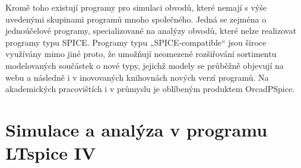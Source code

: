     Kromě toho existují programy pro simulaci obvodů, které nemají s výše uvedenými skupinami programů mnoho společného. Jedná se zejména o
    jednoúčelové programy, specializované na analýzy obvodů, které nelze realizovat programy typu SPICE. Programy typu „SPICE-compatible“ jsou široce
    využívány mimo jiné proto, že umožňují neomezené rozšiřování sortimentu modelovaných součástek o nové typy, jejichž modely se průběžně objevují na
    webu a následně i v inovovaných knihovnách nových verzí programů. Na akademických pracovištích i v průmyslu je oblíbeným produktem
    OrcadPSpice.\cite[s.~10]{Biolek2}

  \section{Simulace a analýza v programu LTspice IV}   